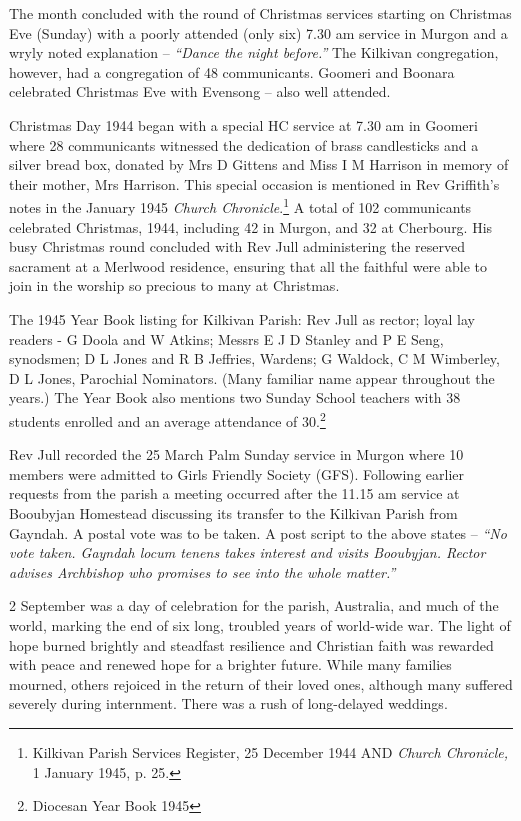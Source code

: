 The month concluded with the round of Christmas services starting on Christmas Eve (Sunday) with a poorly attended (only six) 7.30 am service in Murgon and a wryly noted explanation -- \emph{``Dance the night before.''} The Kilkivan congregation, however, had a congregation of 48 communicants. Goomeri and Boonara celebrated Christmas Eve with Evensong -- also well attended.

Christmas Day 1944 began with a special HC service at 7.30 am in Goomeri where 28 communicants witnessed the dedication of brass candlesticks and a silver bread box, donated by Mrs D Gittens and Miss I M Harrison in memory of their mother, Mrs Harrison. This special occasion is mentioned in Rev Griffith's notes in the January 1945 \emph{Church Chronicle}.\footnote{Kilkivan Parish Services Register, 25 December 1944 AND \emph{Church Chronicle,} 1 January 1945, p. 25.} A total of 102 communicants celebrated Christmas, 1944, including 42 in Murgon, and 32 at Cherbourg. His busy Christmas round concluded with Rev Jull administering the reserved sacrament at a Merlwood residence, ensuring that all the faithful were able to join in the worship so precious to many at Christmas.

The 1945 Year Book listing for Kilkivan Parish: Rev Jull as rector; loyal lay readers - G Doola and W Atkins; Messrs E J D Stanley and P E Seng, synodsmen; D L Jones and R B Jeffries, Wardens; G Waldock, C M Wimberley, D L Jones, Parochial Nominators. (Many familiar name appear throughout the years.) The Year Book also mentions two Sunday School teachers with 38 students enrolled and an average attendance of 30.\footnote{Diocesan Year Book 1945}

Rev Jull recorded the 25 March Palm Sunday service in Murgon where 10 members were admitted to Girls Friendly Society (GFS). Following earlier requests from the parish a meeting occurred after the 11.15 am service at Booubyjan Homestead discussing its transfer to the Kilkivan Parish from Gayndah. A postal vote was to be taken. A post script to the above states -- \emph{``No vote taken. Gayndah locum tenens takes interest and visits Booubyjan. Rector advises Archbishop who promises to see into the whole matter.''}

2 September was a day of celebration for the parish, Australia, and much of the world, marking the end of six long, troubled years of world-wide war. The light of hope burned brightly and steadfast resilience and Christian faith was rewarded with peace and renewed hope for a brighter future. While many families mourned, others rejoiced in the return of their loved ones, although many suffered severely during internment. There was a rush of long-delayed weddings.

